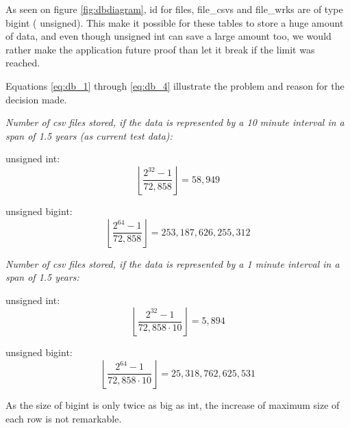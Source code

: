 As seen on figure \ref{fig:dbdiagram}, \textsf{id} for  \textsf{files, file\_csvs} and  \textsf{file\_wrks} are of type \textsf{bigint} ( \textsf{unsigned}). This make it possible for these tables to store a huge amount of data, and even though \textsf{unsigned int} can save a large amount too, we would rather make the application future proof than let it break if the limit was reached.

Equations \ref{eq:db_1} through \ref{eq:db_4} illustrate the problem and reason for the decision made.

\emph{Number of csv files stored, if the data is represented by a 10 minute interval in a span of 1.5 years (as current test data):}

\textsf{unsigned int}: 
\begin{equation}
\label{eq:db_1}
\left\lfloor \frac{2^{32}-1}{72,858} \right\rfloor = 58,949
\end{equation}

\textsf{unsigned bigint}:
\begin{equation}
\label{eq:db_2}
\left\lfloor \frac{2^{64}-1}{72,858} \right\rfloor = 253,187,626,255,312
\end{equation}

\emph{Number of csv files stored, if the data is represented by a 1 minute interval in a span of 1.5 years:}

\textsf{unsigned int}:
\begin{equation}
\label{eq:db_3}
\left\lfloor \frac{2^{32}-1}{72,858 \cdot 10} \right\rfloor = 5,894
\end{equation}

\textsf{unsigned bigint}:
\begin{equation}
\label{eq:db_4}
\left\lfloor \frac{2^{64}-1}{72,858 \cdot 10} \right\rfloor = 25,318,762,625,531
\end{equation}

As the size of \textsf{bigint} is only twice as big as \textsf{int}, the increase of maximum size of each row is not remarkable.